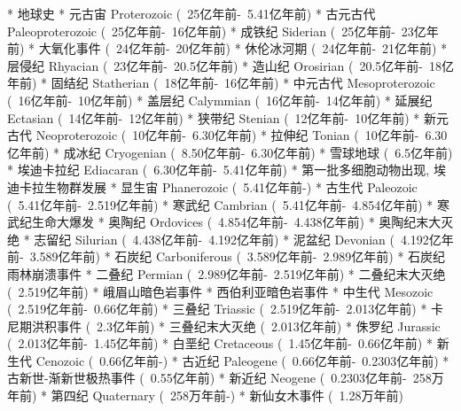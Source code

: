 
* 地球史
	* 元古宙 Proterozoic	(~25亿年前-~5.41亿年前)
		* 古元古代 Paleoproterozoic	(~25亿年前-~16亿年前)
			* 成铁纪 Siderian	(~25亿年前-~23亿年前)
				* 大氧化事件	(~24亿年前-~20亿年前)
				* 休伦冰河期	(~24亿年前-~21亿年前)
			* 层侵纪 Rhyacian	(~23亿年前-~20.5亿年前)
			* 造山纪 Orosirian	(~20.5亿年前-~18亿年前)
			* 固结纪 Statherian	(~18亿年前-~16亿年前)
		* 中元古代 Mesoproterozoic	(~16亿年前-~10亿年前)
			* 盖层纪 Calymmian	(~16亿年前-~14亿年前)
			* 延展纪 Ectasian	(~14亿年前-~12亿年前)
			* 狭带纪 Stenian	(~12亿年前-~10亿年前)
		* 新元古代 Neoproterozoic	(~10亿年前-~6.30亿年前)
			* 拉伸纪 Tonian	(~10亿年前-~6.30亿年前)
			* 成冰纪 Cryogenian	(~8.50亿年前-~6.30亿年前)
				* 雪球地球	(~6.5亿年前)
			* 埃迪卡拉纪 Ediacaran (~6.30亿年前-~5.41亿年前)
				* 第一批多细胞动物出现, 埃迪卡拉生物群发展
	* 显生宙 Phanerozoic	(~5.41亿年前-)
		* 古生代 Paleozoic	(~5.41亿年前-~2.519亿年前)
			* 寒武纪 Cambrian	(~5.41亿年前-~4.854亿年前)
				* 寒武纪生命大爆发
			* 奥陶纪 Ordovices	(~4.854亿年前-~4.438亿年前)
				* 奥陶纪末大灭绝
			* 志留纪 Silurian	(~4.438亿年前-~4.192亿年前)
			* 泥盆纪 Devonian	(~4.192亿年前-~3.589亿年前)
			* 石炭纪 Carboniferous	(~3.589亿年前-~2.989亿年前)
				* 石炭纪雨林崩溃事件
			* 二叠纪 Permian	(~2.989亿年前-~2.519亿年前)
				* 二叠纪末大灭绝	(~2.519亿年前)
					* 峨眉山暗色岩事件
					* 西伯利亚暗色岩事件
		* 中生代 Mesozoic	(~2.519亿年前-~0.66亿年前)
			* 三叠纪 Triassic	(~2.519亿年前-~2.013亿年前)
				* 卡尼期洪积事件	(~2.3亿年前)
				* 三叠纪末大灭绝	(~2.013亿年前)
			* 侏罗纪 Jurassic	(~2.013亿年前-~1.45亿年前)
			* 白垩纪 Cretaceous	(~1.45亿年前-~0.66亿年前)
		* 新生代 Cenozoic	(~0.66亿年前-)
			* 古近纪 Paleogene	(~0.66亿年前-~0.2303亿年前)
				* 古新世-渐新世极热事件	(~0.55亿年前)
			* 新近纪 Neogene	(~0.2303亿年前-~258万年前)
			* 第四纪 Quaternary	(~258万年前-)
				* 新仙女木事件	(~1.28万年前)

